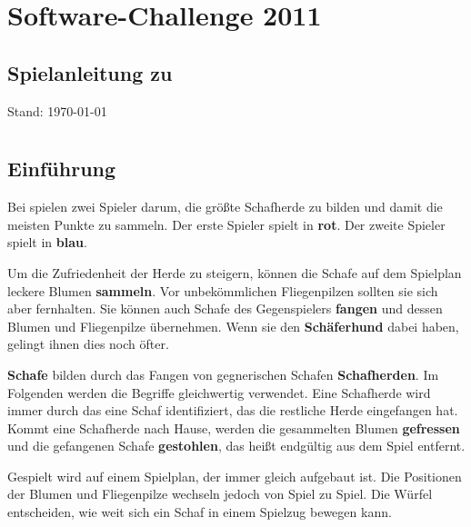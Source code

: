 \documentclass[11pt,pointlessnumbers,DIV10,BCOR10mm,tocleft]{scrreprt}
\begin{document}
\verydarkgray
\chapter*{Software-Challenge 2011}
\vspace*{-.9cm}
\section*{Spielanleitung zu }
\thispagestyle{empty}
\vspace*{-.2cm}

\vfill
Stand: \today

\pagestyle{headings}
\tableofcontents

\pagestyle{plain}
\chapter*{}
\section{Einführung}
Bei  spielen zwei Spieler darum, die größte Schafherde zu bilden und damit die meisten Punkte zu sammeln. Der erste Spieler spielt in \textbf{rot}. Der zweite Spieler spielt in \textbf{blau}.

Um die Zufriedenheit der Herde zu steigern, können die Schafe auf dem Spielplan leckere Blumen \textbf{sammeln}. Vor unbekömmlichen Fliegenpilzen sollten sie sich aber fernhalten. Sie können auch Schafe des Gegenspielers \textbf{fangen} und dessen Blumen und Fliegenpilze übernehmen. Wenn sie den \textbf{Schäferhund} dabei haben, gelingt ihnen dies noch öfter.

\textbf{Schafe} bilden durch das Fangen von gegnerischen Schafen \textbf{Schafherden}. Im Folgenden werden die Begriffe gleichwertig verwendet. Eine Schafherde wird immer durch das eine Schaf identifiziert, das die restliche Herde eingefangen hat. Kommt eine Schafherde nach Hause, werden die gesammelten Blumen \textbf{gefressen} und die gefangenen Schafe \textbf{gestohlen}, das heißt endgültig aus dem Spiel entfernt.

Gespielt wird auf einem Spielplan, der immer gleich aufgebaut ist. Die Positionen der Blumen und Fliegenpilze wechseln jedoch von Spiel zu Spiel. Die Würfel entscheiden, wie weit sich ein Schaf in einem Spielzug bewegen kann.
\end{document}
